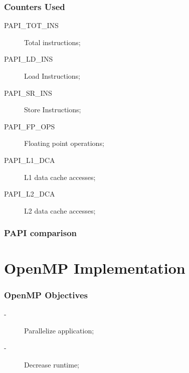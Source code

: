 \documentclass{beamer}
\begin{document}
\begin{frame}
	\frametitle{Counters Used}
	\begin{description}
		\item[PAPI\_TOT\_INS] Total instructions;
		\item[PAPI\_LD\_INS] Load Instructions;
		\item[PAPI\_SR\_INS] Store Instructions;
		\item[PAPI\_FP\_OPS] Floating point operations;
		\item[PAPI\_L1\_DCA] L1 data cache accesses;
		\item[PAPI\_L2\_DCA] L2 data cache accesses;
	\end{description}
\end{frame}

\begin{frame}
	\frametitle{PAPI comparison}
	\begin{center}

			\begin{table}[!htp]
			\caption{PAPI comparison}
			\label{tab:testcases}
			\end{table}
		\end{center}

\end{frame}


\section{OpenMP Implementation}

\begin{frame}
	\frametitle{OpenMP Objectives}
	\begin{description}
		\item [-] Parallelize application;
		\item [-] Decrease runtime;
	\end{description}
\end{frame}	
\end{document}
